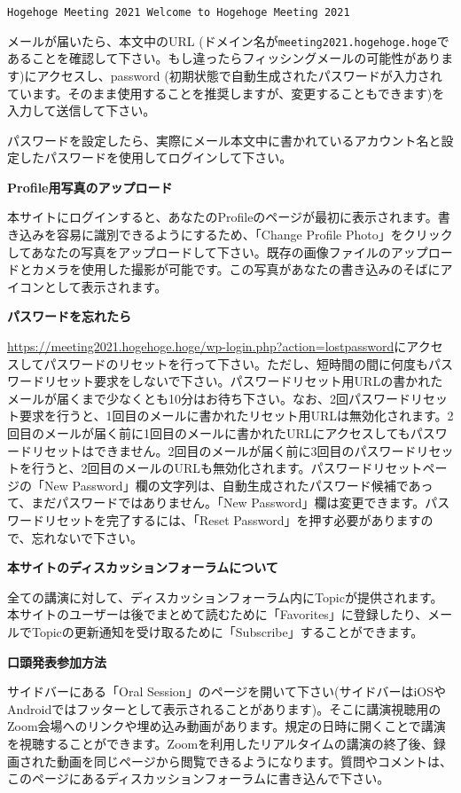 \documentclass[titlepage,10pt,a4paper,uplatex]{jsbook}
\newenvironment{content}{\begin{shaded}\vspace{-1em}\raggedright\ttfamily\footnotesize\setlength{\baselineskip}{1.4em}}{\end{shaded}\vspace{-1em}}
\renewcommand{\textbf}[1]{{\bfseries\sffamily#1}}
\begin{document}
\begin{content}
\texttt{{\lbrack}Hogehoge Meeting 2021{\rbrack} Welcome to Hogehoge Meeting 2021}

メールが届いたら、本文中のURL (ドメイン名が\texttt{meeting2021.hogehoge.hoge}であることを確認して下さい。もし違ったらフィッシングメールの可能性があります)にアクセスし、password (初期状態で自動生成されたパスワードが入力されています。そのまま使用することを推奨しますが、変更することもできます)を入力して送信して下さい。

パスワードを設定したら、実際にメール本文中に書かれているアカウント名と設定したパスワードを使用してログインして下さい。

\textbf{\Large Profile用写真のアップロード}

本サイトにログインすると、あなたのProfileのページが最初に表示されます。書き込みを容易に識別できるようにするため、「Change Profile Photo」をクリックしてあなたの写真をアップロードして下さい。既存の画像ファイルのアップロードとカメラを使用した撮影が可能です。この写真があなたの書き込みのそばにアイコンとして表示されます。

\textbf{\Large パスワードを忘れたら}

\url{https://meeting2021.hogehoge.hoge/wp-login.php?action=lostpassword}にアクセスしてパスワードのリセットを行って下さい。ただし、短時間の間に何度もパスワードリセット要求をしないで下さい。パスワードリセット用URLの書かれたメールが届くまで少なくとも10分はお待ち下さい。なお、2回パスワードリセット要求を行うと、1回目のメールに書かれたリセット用URLは無効化されます。2回目のメールが届く前に1回目のメールに書かれたURLにアクセスしてもパスワードリセットはできません。2回目のメールが届く前に3回目のパスワードリセットを行うと、2回目のメールのURLも無効化されます。パスワードリセットページの「New Password」欄の文字列は、自動生成されたパスワード候補であって、まだパスワードではありません。「New Password」欄は変更できます。パスワードリセットを完了するには、「Reset Password」を押す必要がありますので、忘れないで下さい。

\textbf{\Large 本サイトのディスカッションフォーラムについて}

全ての講演に対して、ディスカッションフォーラム内にTopicが提供されます。本サイトのユーザーは後でまとめて読むために「Favorites」に登録したり、メールでTopicの更新通知を受け取るために「Subscribe」することができます。

\textbf{\Large 口頭発表参加方法}

サイドバーにある「Oral Session」のページを開いて下さい(サイドバーはiOSやAndroidではフッターとして表示されることがあります)。そこに講演視聴用のZoom会場へのリンクや埋め込み動画があります。規定の日時に開くことで講演を視聴することができます。Zoomを利用したリアルタイムの講演の終了後、録画された動画を同じページから閲覧できるようになります。質問やコメントは、このページにあるディスカッションフォーラムに書き込んで下さい。


\end{content}
\end{document}
